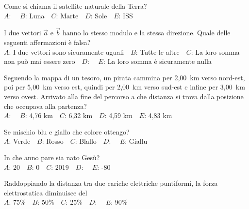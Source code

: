\mcquestionfooter



\def\mcquestionnumber{4}


\mcquestionheader Come si chiama il satellite naturale della Terra?\\
{$A$}: \ \ {$B$}: Luna\ \ {$C$}: Marte\ \ {$D$}: Sole\ \ {$E$}: ISS\ \ 

\mcquestionfooter



\def\mcquestionnumber{5}


\mcquestionheader I due vettori $\vec{a}$ e $\vec{b}$ hanno lo stesso modulo e la stessa direzione. Quale delle seguenti affermazioni è falsa?\\
{$A$}: I due vettori sono sicuramente uguali\ \ {$B$}: Tutte le altre\ \ {$C$}: La loro somma non può mai essere zero\ \ {$D$}: \ \ {$E$}: La loro somma è sicuramente nulla\ \ 

\mcquestionfooter



\def\mcquestionnumber{6}


\mcquestionheader Seguendo la mappa di un tesoro, un pirata cammina per 2,00~km verso nord-est, poi per 5,00~km verso est, quindi per 2,00~km verso sud-est e infine per 3,00~km verso ovest. Arrivato alla fine del percorso a che distanza si trova dalla posizione che occupava alla partenza?\\
{$A$}: \ \ {$B$}: 4,76 km\ \ {$C$}: 6,32 km\ \ {$D$}: 4,59 km\ \ {$E$}: 4,83 km\ \ 

\mcquestionfooter



\def\mcquestionnumber{7}


\mcquestionheader Se mischio blu e giallo che colore ottengo?\\
{$A$}: Verde\ \ {$B$}: Rosso\ \ {$C$}: Blallo\ \ {$D$}: \ \ {$E$}: Giallu\ \ 

\mcquestionfooter



\def\mcquestionnumber{8}


\mcquestionheader In che anno pare sia nato Gesù?\\
{$A$}: 20\ \ {$B$}: 0\ \ {$C$}: 2019\ \ {$D$}: \ \ {$E$}: -80\ \ 

\mcquestionfooter



\def\mcquestionnumber{9}


\mcquestionheader Raddoppiando la distanza tra due cariche elettriche puntiformi, la forza elettrostatica diminuisce del\\
{$A$}: 75\%\ \ {$B$}: 50\%\ \ {$C$}: 25\%\ \ {$D$}: \ \ {$E$}: 90\%\ \ 

